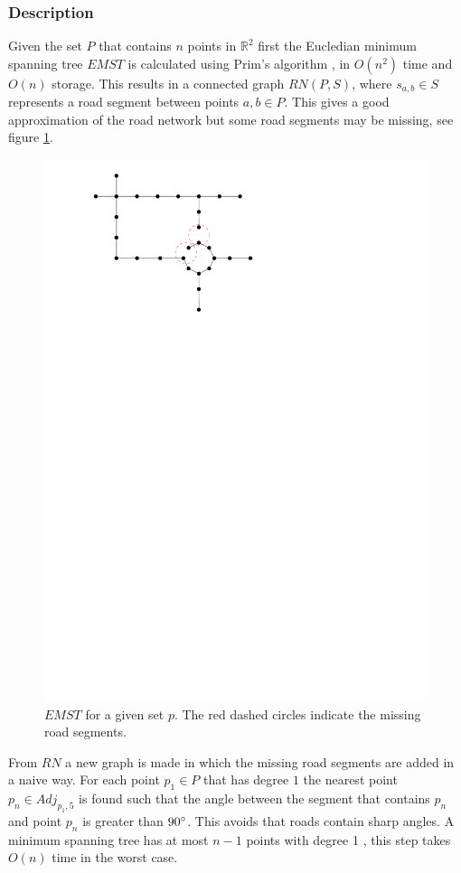 \documentclass[11pt]{article}
\begin{document}
\subsubsection{Description}
Given the set $P$ that contains $n$ points in $\mathbb{R}^2$ first the Eucledian minimum spanning tree $EMST$ is calculated using Prim's algorithm \cite{p-scnsg-57}, in $O(n^2)$ time and $O(n)$ storage. This results in a connected graph $RN(P,S)$, where $s_{a,b}\in S$ represents a road segment between points $a,b \in P$. This gives a good approximation of the road network but some road segments may be missing, see figure \ref{emst}.

\begin{figure}[h]
  \centering
      \graphicspath{ {images/}}
      \includegraphics[width=0.5\linewidth]{NetworkMST}
      \caption{$EMST$ for a given set $p$. The red dashed circles indicate the missing road segments.}
      \label{emst}
  \end{figure}

From $RN$ a new graph is made in which the missing road segments are added in a naive way. For each point $p_1 \in P$ that has degree $1$ the nearest point $p_n \in Adj_{p_1,5}$ is found such that the angle between the segment that contains $p_n$ and point $p_n$ is greater than $90\degree$. This avoids that roads contain sharp angles. A minimum spanning tree has at most $n-1$ points with degree 1 \cite{clrs-ia-09}, this step takes $O(n)$ time in the worst case.
\end{document}
